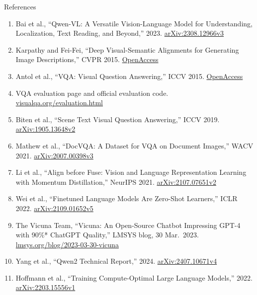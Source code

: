 \begin{frame}[allowframebreaks]{References}
  \scriptsize
  \setlength{\parskip}{0pt}
  \begin{enumerate}\itemsep0.15em
    \item Bai et al., ``Qwen-VL: A Versatile Vision-Language Model for Understanding, Localization, Text Reading, and Beyond,'' 2023. \href{https://arxiv.org/abs/2308.12966v3}{arXiv:2308.12966v3}
    \item Karpathy and Fei-Fei, ``Deep Visual-Semantic Alignments for Generating Image Descriptions,'' CVPR 2015. \href{https://openaccess.thecvf.com/content_cvpr_2015/papers/Karpathy_Deep_Visual-Semantic_Alignments_2015_CVPR_paper.pdf}{OpenAccess}
    \item Antol et al., ``VQA: Visual Question Answering,'' ICCV 2015. \href{https://openaccess.thecvf.com/content_iccv_2015/papers/Antol_VQA_Visual_Question_ICCV_2015_paper.pdf}{OpenAccess}
    \item VQA evaluation page and official evaluation code. \href{https://visualqa.org/evaluation.html}{visualqa.org/evaluation.html}
    \item Biten et al., ``Scene Text Visual Question Answering,'' ICCV 2019. \href{https://arxiv.org/abs/1905.13648v2}{arXiv:1905.13648v2}
    \item Mathew et al., ``DocVQA: A Dataset for VQA on Document Images,'' WACV 2021. \href{https://arxiv.org/abs/2007.00398v3}{arXiv:2007.00398v3}
    \item Li et al., ``Align before Fuse: Vision and Language Representation Learning with Momentum Distillation,'' NeurIPS 2021. \href{https://arxiv.org/abs/2107.07651v2}{arXiv:2107.07651v2}
    \item Wei et al., ``Finetuned Language Models Are Zero-Shot Learners,'' ICLR 2022. \href{https://arxiv.org/abs/2109.01652v5}{arXiv:2109.01652v5}
    \item The Vicuna Team, ``Vicuna: An Open-Source Chatbot Impressing GPT-4 with 90\%* ChatGPT Quality,'' LMSYS blog, 30 Mar.\ 2023. \href{https://www.lmsys.org/blog/2023-03-30-vicuna/}{lmsys.org/blog/2023-03-30-vicuna}
    \item Yang et al., ``Qwen2 Technical Report,'' 2024. \href{https://arxiv.org/abs/2407.10671v4}{arXiv:2407.10671v4}
    \item Hoffmann et al., ``Training Compute-Optimal Large Language Models,'' 2022. \href{https://arxiv.org/abs/2203.15556v1}{arXiv:2203.15556v1}

\end{enumerate}
\end{frame}
